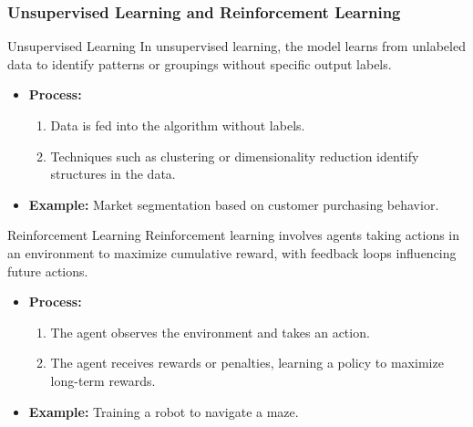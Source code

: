 \documentclass[aspectratio=169]{beamer}
\begin{document}
\begin{frame}[fragile]
    \frametitle{Unsupervised Learning and Reinforcement Learning}
    \begin{block}{Unsupervised Learning}
        In unsupervised learning, the model learns from unlabeled data to identify patterns or groupings without specific output labels.
    \end{block}
    \begin{itemize}
        \item \textbf{Process:}
            \begin{enumerate}
                \item Data is fed into the algorithm without labels.
                \item Techniques such as clustering or dimensionality reduction identify structures in the data.
            \end{enumerate}
        \item \textbf{Example:} Market segmentation based on customer purchasing behavior.
    \end{itemize}

    \begin{block}{Reinforcement Learning}
        Reinforcement learning involves agents taking actions in an environment to maximize cumulative reward, with feedback loops influencing future actions.
    \end{block}
    \begin{itemize}
        \item \textbf{Process:}
            \begin{enumerate}
                \item The agent observes the environment and takes an action.
                \item The agent receives rewards or penalties, learning a policy to maximize long-term rewards.
            \end{enumerate}
        \item \textbf{Example:} Training a robot to navigate a maze.
    \end{itemize}
\end{frame}
\end{document}
